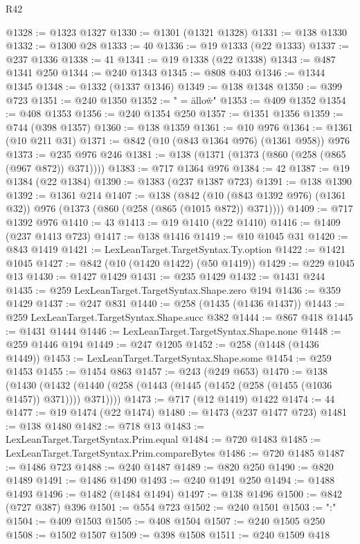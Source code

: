 \begin{lexlean}{R42}
\begin{coremodule}
@1328 := @1323 @1327
@1330 := @1301 (@1321 @1328)
@1331 := @138 @1330
@1332 := @1300 @28
@1333 := 40
@1336 := @19 @1333 (@22 @1333)
@1337 := @237 @1336
@1338 := 41
@1341 := @19 @1338 (@22 @1338)
@1343 := @487 @1341 @250
@1344 := @240 @1343
@1345 := @808 @403
@1346 := @1344 @1345
@1348 := @1332 (@1337 @1346)
@1349 := @138 @1348
@1350 := @399 @723
@1351 := @240 @1350
@1352 := " = \"allow\"\n"
@1353 := @409 @1352
@1354 := @408 @1353
@1356 := @240 @1354 @250
@1357 := @1351 @1356
@1359 := @744 (@398 @1357)
@1360 := @138 @1359
@1361 := @10 @976
@1364 := @1361 (@10 @211 @31)
@1371 := @842 (@10 (@843 @1364 @976) (@1361 @958)) @976
@1373 := @235 @976 @246
@1381 := @138 (@1371 (@1373 (@860 (@258 (@865 (@967 @872)) @371))))
@1383 := @717 @1364 @976
@1384 := 42
@1387 := @19 @1384 (@22 @1384)
@1390 := @1383 (@237 @1387 @723)
@1391 := @138 @1390
@1392 := @1361 @214
@1407 := @138
    (@842 (@10 (@843 @1392 @976) (@1361 @32)) @976 (@1373 (@860 (@258 (@865 (@1015 @872)) @371))))
@1409 := @717 @1392 @976
@1410 := 43
@1413 := @19 @1410 (@22 @1410)
@1416 := @1409 (@237 @1413 @723)
@1417 := @138 @1416
@1419 := @10 @1045 @31
@1420 := @843 @1419
@1421 := LexLeanTarget.TargetSyntax.Ty.option
@1422 := @1421 @1045
@1427 := @842 (@10 (@1420 @1422) (@50 @1419))
@1429 := @229 @1045 @13
@1430 := @1427 @1429
@1431 := @235 @1429
@1432 := @1431 @244
@1435 := @259 LexLeanTarget.TargetSyntax.Shape.zero @194
@1436 := @359 @1429
@1437 := @247 @831
@1440 := @258 (@1435 (@1436 @1437))
@1443 := @259 LexLeanTarget.TargetSyntax.Shape.succ @382
@1444 := @867 @418
@1445 := @1431 @1444
@1446 := LexLeanTarget.TargetSyntax.Shape.none
@1448 := @259 @1446 @194
@1449 := @247 @1205
@1452 := @258 (@1448 (@1436 @1449))
@1453 := LexLeanTarget.TargetSyntax.Shape.some
@1454 := @259 @1453
@1455 := @1454 @863
@1457 := @243 (@249 @653)
@1470 := @138
    (@1430 (@1432 (@1440 (@258 (@1443 (@1445 (@1452 (@258 (@1455 (@1036 @1457)) @371)))) @371))))
@1473 := @717 (@12 @1419) @1422
@1474 := 44
@1477 := @19 @1474 (@22 @1474)
@1480 := @1473 (@237 @1477 @723)
@1481 := @138 @1480
@1482 := @718 @13
@1483 := LexLeanTarget.TargetSyntax.Prim.equal
@1484 := @720 @1483
@1485 := LexLeanTarget.TargetSyntax.Prim.compareBytes
@1486 := @720 @1485
@1487 := @1486 @723
@1488 := @240 @1487
@1489 := @820 @250
@1490 := @820 @1489
@1491 := @1486 @1490
@1493 := @240 @1491 @250
@1494 := @1488 @1493
@1496 := @1482 (@1484 @1494)
@1497 := @138 @1496
@1500 := @842 (@727 @387) @396
@1501 := @554 @723
@1502 := @240 @1501
@1503 := ":"
@1504 := @409 @1503
@1505 := @408 @1504
@1507 := @240 @1505 @250
@1508 := @1502 @1507
@1509 := @398 @1508
@1511 := @240 @1509 @418

\end{coremodule}
\end{lexlean}
